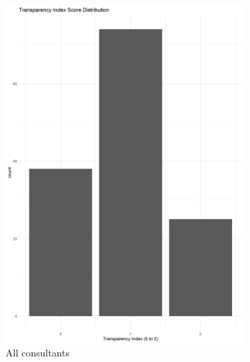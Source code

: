 \documentclass[11pt, letterpaper, twoside]{article}
\begin{document}
\begin{figure}[h]
    \centering
    \begin{subfigure}[h]{0.45\textwidth}
        \includegraphics[width=\textwidth]{figures/transparencyPlot.png}
        \caption{All consultants}        
    \end{subfigure}
    \hfill
    \begin{subfigure}[h]{0.45\textwidth}

\end{subfigure}
\end{figure}
\end{document}
